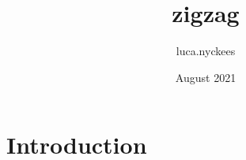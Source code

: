 \documentclass{article}
\title{zigzag}
\author{luca.nyckees }
\date{August 2021}
\begin{document}
\maketitle

\section{Introduction}
\end{document}
